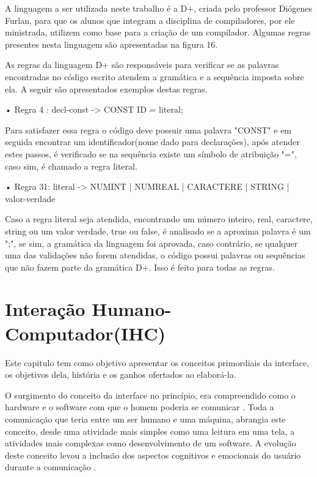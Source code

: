 \documentclass[12pt,oneside,a4paper,chapter=TITLE,section=TITLE,sumario=tradicional]{abntex2}
\begin{document}
A linguagem a ser utilizada neste trabalho é a D+, criada pelo professor Diógenes Furlan, para que os alunos que integram a disciplina de compiladores, por ele ministrada, utilizem como base para a criação de um compilador. Algumas regras presentes nesta linguagem são apresentadas na figura 16.

\begin{figure}[htb]
\end{figure}

As regras da linguagem D+ são responsáveis para verificar se as palavras encontradas no código escrito atendem a gramática e a sequência imposta sobre ela. A seguir são apresentados exemplos destas regras.

•	Regra 4 : decl-const -> CONST ID = literal;

Para satisfazer essa regra o código deve possuir uma palavra "CONST" e em seguida encontrar um identificador(nome dado para declarações), após atender estes passos, é verificado se na sequência existe um símbolo de atribuição "=", caso sim, é chamado a regra literal.

•	Regra 31: literal -> NUMINT | NUMREAL | CARACTERE | STRING | valor-verdade

Caso a regra literal seja atendida, encontrando um número inteiro, real, caractere, string ou um valor verdade, true ou false, é analisado se a aproxima palavra é um ";", se sim, a gramática da linguagem foi aprovada, caso contrário, se qualquer uma das validações não forem atendidas, o código possui palavras ou sequências que não fazem parte da gramática D+. Isso é feito para todas as regras. 

\chapter{Interação Humano-Computador(IHC)}
\label{cap:interacao-humano-computador}

Este capitulo tem como objetivo apresentar os conceitos primordiais da interface, os objetivos dela, história e os ganhos ofertados ao elaborá-la. 

O surgimento do conceito da interface no princípio, era compreendido como o hardware e o software com que o homem poderia se comunicar \cite{rocha2003}.  Toda a comunicação que teria entre um ser humano e uma máquina, abrangia este conceito, desde uma atividade mais simples como uma leitura em uma tela, a atividades mais complexas como desenvolvimento de um software. A evolução deste conceito levou a inclusão dos aspectos cognitivos e emocionais do usuário durante a comunicação \cite{rocha2003}.
\end{document}
